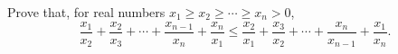 Prove that, for real numbers $x_1 \geq x_2 \geq \cdots \geq x_n > 0$,
\[ \frac{x_1}{x_2} + \frac{x_2}{x_3} + \cdots + \frac{x_{n-1}}{x_n} + \frac{x_n}{x_1} \leq \frac{x_2}{x_1} + \frac{x_3}{x_2} + \cdots + \frac{x_n}{x_{n-1}} + \frac{x_1}{x_n}. \]
